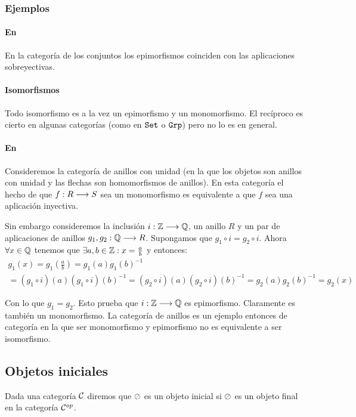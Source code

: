 \subsubsection{Ejemplos}
\paragraph{En \Set}
En la categoría de los conjuntos los epimorfismos coinciden con las
aplicaciones sobreyectivas.

\paragraph{Isomorfismos}
Todo isomorfismo es a la vez
un epimorfismo y un monomorfismo. El recíproco
es cierto en algunas categorías (como en $\texttt{Set}$ o $\texttt{Grp}$) pero no
lo es en general.

\paragraph{En \Ring}
Consideremos la categoría de anillos con unidad (en la
que los objetos son anillos con unidad y
las flechas son homomorfismos de anillos). En esta categoría
el hecho de que $f : R\longrightarrow S$ sea un monomorfismo
es equivalente a que $f$ sea una aplicación
inyectiva.

Sin embargo consideremos la inclusión
$i : \mathbb{Z}\longrightarrow \mathbb{Q}$, un anillo $R$
y un par de aplicaciones de anillos $g_1, g_2 : \mathbb{Q}\longrightarrow R$. Supongamos
que $g_1 \circ i = g_2 \circ i$. Ahora  $\forall x \in \mathbb{Q}$
tenemos que $\exists a, b \in \mathbb{Z} : x = \frac{a}{b}$ y entonces:
\begin{multline*}
g_1(x) = g_1(\frac{a}{b}) = g_1(a)g_1(b)^{-1} \\
       = (g_1 \circ i)(a)(g_1\circ i)(b)^{-1}
       = (g_2\circ i)(a)(g_2\circ i)(b)^{-1}
       = g_2(a)g_2(b)^{-1} = g_2(x)
\end{multline*}

Con lo que $g_1=g_2$. Esto prueba que $i : \mathbb{Z}\longrightarrow \mathbb{Q}$ es epimorfismo.
Claramente es también un monomorfismo. La categoría de anillos es
un ejemplo entonces de categoría en la que ser monomorfismo y
epimorfismo no es equivalente a ser isomorfismo.

\subsection{Objetos iniciales}
\begin{definition}
Dada una categoría $\mathcal{C}$ diremos que $\oslash$ es un objeto
inicial si $\oslash$ es un objeto final en la categoría
$\mathcal{C}^{op}$.
\end{definition}

